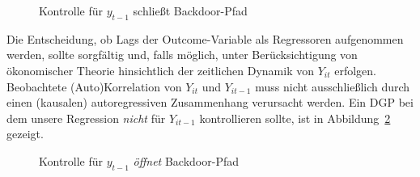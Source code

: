 \documentclass[
  a4paper,
  DIV=11,
  oneside]{scrreprt}
\begin{document}
\begin{figure}[t]


\caption{\label{fig-LDVOKb}Kontrolle für \(y_{t-1}\) schließt
Backdoor-Pfad}

\end{figure}%

Die Entscheidung, ob Lags der Outcome-Variable als Regressoren
aufgenommen werden, sollte sorgfältig und, falls möglich, unter
Berücksichtigung von ökonomischer Theorie hinsichtlich der zeitlichen
Dynamik von \(Y_{it}\) erfolgen. Beobachtete (Auto)Korrelation von
\(Y_{it}\) und \(Y_{it-1}\) muss nicht ausschließlich durch einen
(kausalen) autoregressiven Zusammenhang verursacht werden. Ein DGP bei
dem unsere Regression \emph{nicht} für \(Y_{it-1}\) kontrollieren
sollte, ist in Abbildung~\ref{fig-LDVnotOK} gezeigt.

\begin{figure}[t]


\caption{\label{fig-LDVnotOK}Kontrolle für \(y_{t-1}\) \emph{öffnet}
Backdoor-Pfad}

\end{figure}%
\end{document}
